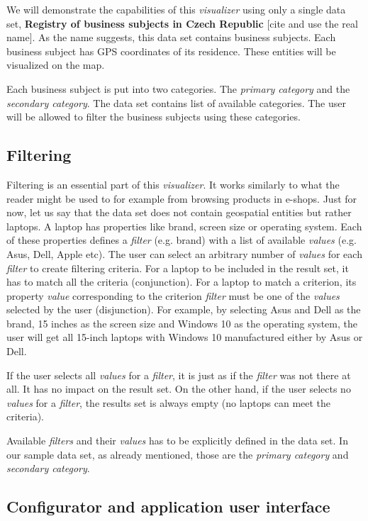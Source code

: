 We will demonstrate the capabilities of this \emph{visualizer} using only a single data set, \textbf{Registry of business subjects in Czech Republic} [cite and use the real name]. As the name suggests, this data set contains business subjects. Each business subject has GPS coordinates of its residence. These entities will be visualized on the map.

Each business subject is put into two categories. The \emph{primary category} and the \emph{secondary category}. The data set contains list of available categories. The user will be allowed to filter the business subjects using these categories.

\subsection{Filtering}

Filtering is an essential part of this \emph{visualizer}. It works similarly to what the reader might be used to for example from browsing products in e-shops. Just for now, let us say that the data set does not contain geospatial entities but rather laptops. A laptop has properties like brand, screen size or operating system. Each of these properties defines a \emph{filter} (e.g. brand) with a list of available \emph{values} (e.g. Asus, Dell, Apple etc). The user can select an arbitrary number of \emph{values} for each \emph{filter} to create filtering criteria. For a laptop to be included in the result set, it has to match all the criteria (conjunction). For a laptop to match a criterion, its property \emph{value} corresponding to the criterion \emph{filter} must be one of the \emph{values} selected by the user (disjunction). For example, by selecting Asus and Dell as the brand, 15 inches as the screen size and Windows 10 as the operating system, the user will get all 15-inch laptops with Windows 10 manufactured either by Asus or Dell.

If the user selects all \emph{values} for a \emph{filter}, it is just as if the \emph{filter} was not there at all. It has no impact on the result set. On the other hand, if the user selects no \emph{values} for a \emph{filter}, the results set is always empty (no laptops can meet the criteria).

Available \emph{filters} and their \emph{values} has to be explicitly defined in the data set. In our sample data set, as already mentioned, those are the \emph{primary category} and \emph{secondary category}.

\subsection{Configurator and application user interface}

